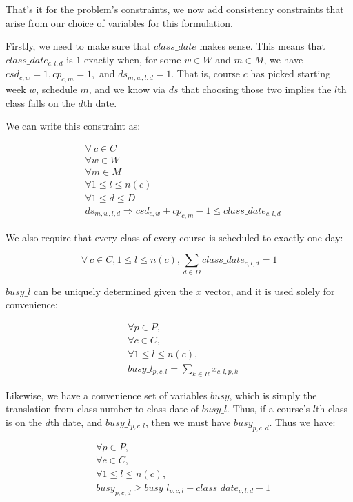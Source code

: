 That's it for the problem's constraints, we now add consistency constraints that arise from our choice of variables for this formulation.

Firstly, we need to make sure that $class\_date$ makes sense. This means that $class\_date_{c, l, d}$ is $1$ exactly when, for some $w \in W$ and $m \in M$, we have $csd_{c, w} = 1, cp_{c, m} = 1,$ and $ds_{m, w, l, d} = 1$. That is, course $c$ has picked starting week $w$, schedule $m$, and we know via $ds$ that choosing those two implies the $l$th class falls on the $d$th date.

We can write this constraint as:

\begin{align*}
  &\forall\ c \in C\\
  &\forall w \in W\\
  &\forall m \in M\\
  &\forall 1 \le l \le n(c)\\
  &\forall 1 \le d \le D\\
  &ds_{m, w, l, d} \Rightarrow csd_{c, w} + cp_{c, m} - 1 \le class\_date_{c, l, d}
\end{align*}

We also require that every class of every course is scheduled to exactly one day:

$$
\forall\ c \in C, 1 \le l \le n(c), \sum_{d \in D} class\_date_{c, l, d} = 1
$$


$busy\_l$ can be uniquely determined given the $x$ vector, and it is used solely for convenience:

\begin{align*}
  &\forall p \in P,\\
  &\forall c \in C,\\
  &\forall 1\le l \le n(c),\\
  &busy\_l_{p, c, l} = \sum_{k \in R} x_{c, l, p, k}
\end{align*}


Likewise, we have a convenience set of variables $busy$, which is simply the translation from class number to class date of $busy\_l$. Thus, if a course's $l$th class is on the $d$th date, and $busy\_l_{p, c, l}$, then we must have $busy_{p, c, d}$. Thus we have:

\begin{align*}
  &\forall p \in P,\\
  &\forall c \in C,\\
  &\forall 1 \le l \le n(c),\\
  &busy_{p, c, d} \ge busy\_l_{p, c, l} + class\_date_{c, l, d} - 1
\end{align*}

